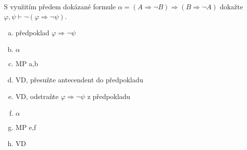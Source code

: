 S využitím předem dokázané formule $\alpha = (A \Rightarrow \neg B) \Rightarrow (B \Rightarrow \neg A)$ dokažte $\varphi, \psi \vdash \neg(\varphi \Rightarrow \neg \psi)$.
\begin{enumerate}[a)]
	\item předpoklad $\varphi \Rightarrow \neg \psi$
	\item $\alpha$
	\item MP a,b
	\item VD, přesuňte antecendent do předpokladu
	\item VD, odstraňte $\varphi \Rightarrow \neg \psi$ z předpokladu
	\item $\alpha$
	\item MP e,f
	\item VD
\end{enumerate}
